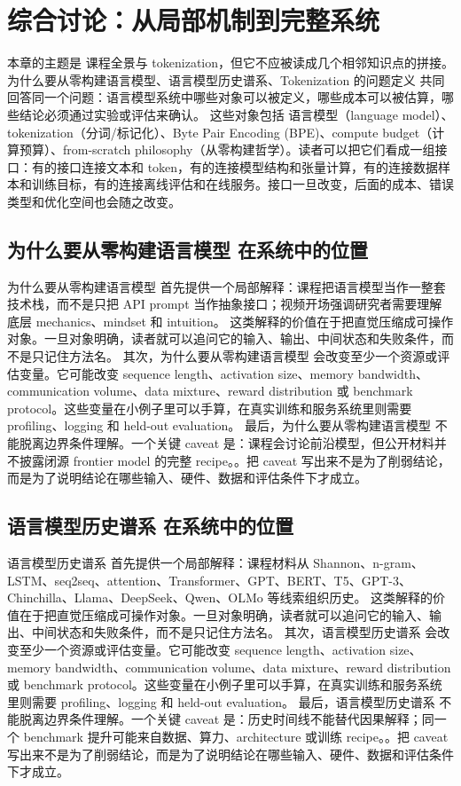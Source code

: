 \documentclass[a4paper]{article}
\begin{document}
\section{综合讨论：从局部机制到完整系统}
本章的主题是 课程全景与 tokenization，但它不应被读成几个相邻知识点的拼接。为什么要从零构建语言模型、语言模型历史谱系、Tokenization 的问题定义 共同回答同一个问题：语言模型系统中哪些对象可以被定义，哪些成本可以被估算，哪些结论必须通过实验或评估来确认。
这些对象包括 语言模型（language model）、tokenization（分词/标记化）、Byte Pair Encoding (BPE)、compute budget（计算预算）、from-scratch philosophy（从零构建哲学）。读者可以把它们看成一组接口：有的接口连接文本和 token，有的连接模型结构和张量计算，有的连接数据样本和训练目标，有的连接离线评估和在线服务。接口一旦改变，后面的成本、错误类型和优化空间也会随之改变。
\subsection{为什么要从零构建语言模型 在系统中的位置}
为什么要从零构建语言模型 首先提供一个局部解释：课程把语言模型当作一整套技术栈，而不是只把 API prompt 当作抽象接口；视频开场强调研究者需要理解底层 mechanics、mindset 和 intuition。 这类解释的价值在于把直觉压缩成可操作对象。一旦对象明确，读者就可以追问它的输入、输出、中间状态和失败条件，而不是只记住方法名。
其次，为什么要从零构建语言模型 会改变至少一个资源或评估变量。它可能改变 sequence length、activation size、memory bandwidth、communication volume、data mixture、reward distribution 或 benchmark protocol。这些变量在小例子里可以手算，在真实训练和服务系统里则需要 profiling、logging 和 held-out evaluation。
最后，为什么要从零构建语言模型 不能脱离边界条件理解。一个关键 caveat 是：课程会讨论前沿模型，但公开材料并不披露闭源 frontier model 的完整 recipe。。把 caveat 写出来不是为了削弱结论，而是为了说明结论在哪些输入、硬件、数据和评估条件下才成立。
\subsection{语言模型历史谱系 在系统中的位置}
语言模型历史谱系 首先提供一个局部解释：课程材料从 Shannon、n-gram、LSTM、seq2seq、attention、Transformer、GPT、BERT、T5、GPT-3、Chinchilla、Llama、DeepSeek、Qwen、OLMo 等线索组织历史。 这类解释的价值在于把直觉压缩成可操作对象。一旦对象明确，读者就可以追问它的输入、输出、中间状态和失败条件，而不是只记住方法名。
其次，语言模型历史谱系 会改变至少一个资源或评估变量。它可能改变 sequence length、activation size、memory bandwidth、communication volume、data mixture、reward distribution 或 benchmark protocol。这些变量在小例子里可以手算，在真实训练和服务系统里则需要 profiling、logging 和 held-out evaluation。
最后，语言模型历史谱系 不能脱离边界条件理解。一个关键 caveat 是：历史时间线不能替代因果解释；同一个 benchmark 提升可能来自数据、算力、architecture 或训练 recipe。。把 caveat 写出来不是为了削弱结论，而是为了说明结论在哪些输入、硬件、数据和评估条件下才成立。
\end{document}
